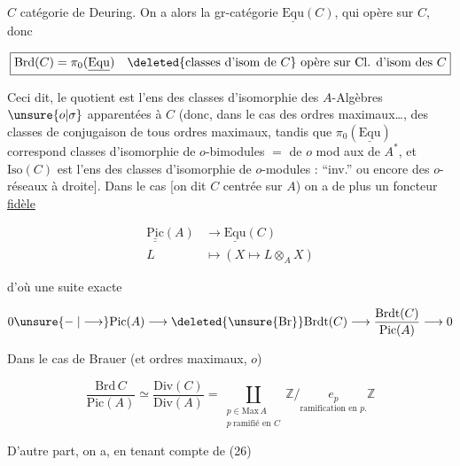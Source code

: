 $C$ catégorie de Deuring. On a alors la gr-catégorie $\underline{\mathrm{Equ}}(C)$, qui opère sur $C$, donc

\[
\boxed{\mathrm{Brd}(C)=\pi_0(\underline{\mathrm{Equ}})\quad
\deleted{\text{classes d'isom de }C}\ \text{opère sur Cl. d'isom des }C}
\]

Ceci dit, le quotient est l'ens des classes d'isomorphie des $A$-Algèbres $\unsure{o|\sigma}$ apparentées à $C$ (donc, dans le cas des  ordres maximaux\ldots,  des classes de conjugaison de tous ordres maximaux, tandis que $\pi_0(\underline{\mathrm{Equ}})$ correspond   classes d'isomorphie de $o$-bimodules $=$  de $o$ mod aux  de  $A^*$,  et $\mathrm{Iso}(C)$ est l'ens des classes d'isomorphie de $o$-modules :  ``inv.''  ou encore des $o$-réseaux  à droite]. Dans le cas     [on dit $C$ centrée sur $A$) on a de plus un foncteur \uline{ fidèle}

\[
\begin{aligned}
\underline{\underline{\mathrm{Pic}}}(A)&\longrightarrow\underline{\mathrm{Equ}}(C)\\
L&\longmapsto(X\longmapsto L\otimes_A X)
\end{aligned}
\]

d'où une suite exacte

\[
0\unsure{\mathrel{-}|\longrightarrow}\mathrm{Pic}(A)\longrightarrow
\deleted{\unsure{\mathrm{Br}}}\mathrm{Brdt}(C)\longrightarrow
\frac{\mathrm{Brdt}(C)}{\mathrm{Pic}(A)}\longrightarrow 0
\]

Dans le cas de Brauer (et ordres maximaux, $o$)

\[
\frac{\mathrm{Brd}\,C}{\mathrm{Pic}(A)}\simeq
\frac{\mathrm{Div}(C)}{\mathrm{Div}(A)}=
\underset{\substack{p\in\mathrm{Max}\,A\\p\ \text{ramifié en }C}}{\coprod}
\mathbb{Z}/\underset{\text{ramification en }p.}{e_p}\mathbb Z
\]


D'autre part, on a, en tenant compte de (26)

